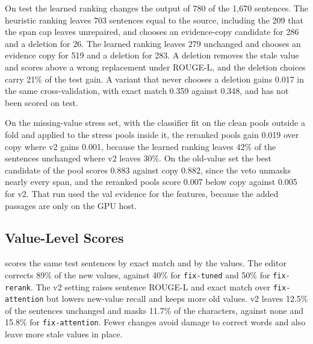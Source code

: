 \documentclass[]{paper}
\newcommand{\run}[1]{\texttt{#1}}
\begin{document}
On test the learned ranking changes the output of 780 of the 1,670 sentences. The heuristic ranking leaves 703 sentences equal to the source, including the 209 that the span cap leaves unrepaired, and chooses an evidence-copy candidate for 286 and a deletion for 26. The learned ranking leaves 279 unchanged and chooses an evidence copy for 519 and a deletion for 283. A deletion removes the stale value and scores above a wrong replacement under ROUGE-L, and the deletion choices carry 21\% of the test gain. A variant that never chooses a deletion gains 0.017 in the same cross-validation, with exact match 0.359 against 0.348, and has not been scored on test.

On the missing-value stress set, with the classifier fit on the clean pools outside a fold and applied to the stress pools inside it, the reranked pools gain 0.019 over copy where v2 gains 0.001, because the learned ranking leaves 42\% of the sentences unchanged where v2 leaves 30\%. On the old-value set the best candidate of the pool scores 0.883 against copy 0.882, since the veto unmasks nearly every span, and the reranked pools score 0.007 below copy against 0.005 for v2. That run used the val evidence for the features, because the added passages are only on the GPU host.


\subsection{Value-Level Scores}

 scores the same test sentences by exact match and by the values. The editor corrects 89\% of the new values, against 40\% for \run{fix-tuned} and 50\% for \run{fix-rerank}. The v2 setting raises sentence ROUGE-L and exact match over \run{fix-attention} but lowers new-value recall and keeps more old values. v2 leaves 12.5\% of the sentences unchanged and masks 11.7\% of the characters, against none and 15.8\% for \run{fix-attention}. Fewer changes avoid damage to correct words and also leave more stale values in place.
\end{document}

